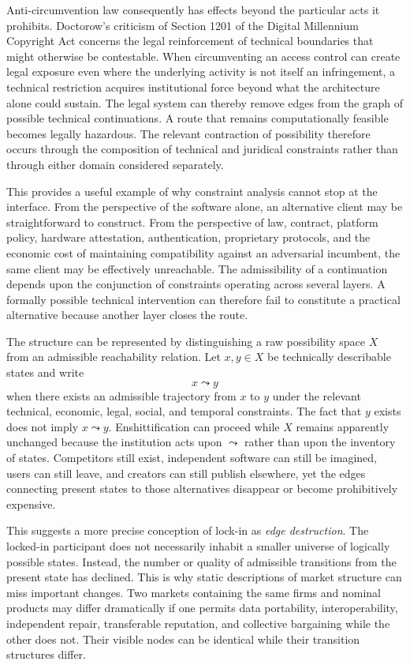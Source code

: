 \documentclass[11pt]{article}
\begin{document}
Anti-circumvention law consequently has effects beyond the particular acts it prohibits. Doctorow's criticism of Section 1201 of the Digital Millennium Copyright Act \parencite{dmca1201} concerns the legal reinforcement of technical boundaries that might otherwise be contestable. When circumventing an access control can create legal exposure even where the underlying activity is not itself an infringement, a technical restriction acquires institutional force beyond what the architecture alone could sustain. The legal system can thereby remove edges from the graph of possible technical continuations. A route that remains computationally feasible becomes legally hazardous. The relevant contraction of possibility therefore occurs through the composition of technical and juridical constraints rather than through either domain considered separately.

This provides a useful example of why constraint analysis cannot stop at the interface. From the perspective of the software alone, an alternative client may be straightforward to construct. From the perspective of law, contract, platform policy, hardware attestation, authentication, proprietary protocols, and the economic cost of maintaining compatibility against an adversarial incumbent, the same client may be effectively unreachable. The admissibility of a continuation depends upon the conjunction of constraints operating across several layers. A formally possible technical intervention can therefore fail to constitute a practical alternative because another layer closes the route.

The structure can be represented by distinguishing a raw possibility space \(X\) from an admissible reachability relation. Let \(x,y\in X\) be technically describable states and write
\[
x \leadsto y
\]
when there exists an admissible trajectory from \(x\) to \(y\) under the relevant technical, economic, legal, social, and temporal constraints. The fact that \(y\) exists does not imply \(x\leadsto y\). Enshittification can proceed while \(X\) remains apparently unchanged because the institution acts upon \(\leadsto\) rather than upon the inventory of states. Competitors still exist, independent software can still be imagined, users can still leave, and creators can still publish elsewhere, yet the edges connecting present states to those alternatives disappear or become prohibitively expensive.

This suggests a more precise conception of lock-in as \emph{edge destruction}. The locked-in participant does not necessarily inhabit a smaller universe of logically possible states. Instead, the number or quality of admissible transitions from the present state has declined. This is why static descriptions of market structure can miss important changes. Two markets containing the same firms and nominal products may differ dramatically if one permits data portability, interoperability, independent repair, transferable reputation, and collective bargaining while the other does not. Their visible nodes can be identical while their transition structures differ.
\end{document}
